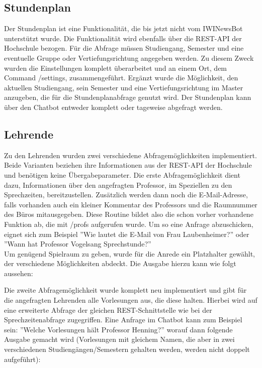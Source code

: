 \subsection{Stundenplan}
Der Stundenplan ist eine Funktionalität, die bis jetzt nicht vom IWINewsBot unterstützt wurde. Die Funktionalität wird ebenfalls über die REST-API der Hochschule bezogen. Für die Abfrage müssen Studiengang, Semester und eine eventuelle Gruppe oder Vertiefungsrichtung angegeben werden. Zu diesem Zweck wurden die Einstellungen komplett überarbeitet und an einem Ort, dem Command /settings, zusammengeführt. Ergänzt wurde die Möglichkeit, den aktuellen Studiengang, sein Semester und eine Vertiefungsrichtung im Master anzugeben, die für die Stundenplanabfrage genutzt wird.
Der Stundenplan kann über den Chatbot entweder komplett oder tageweise abgefragt werden.

\subsection{Lehrende}
Zu den Lehrenden wurden zwei verschiedene Abfragemöglichkeiten implementiert. Beide Varianten beziehen ihre Informationen aus der REST-API der Hochschule und benötigen keine Übergabeparameter. 
Die erste Abfragemöglichkeit dient dazu, Informationen über den angefragten Professor, im Speziellen zu den Sprechzeiten, bereitzustellen. Zusätzlich werden dann noch die E-Mail-Adresse, falls vorhanden auch ein kleiner Kommentar des Professors und die Raumnummer des Büros mitausgegeben. Diese Routine bildet also die schon vorher vorhandene Funktion ab, die mit /profs aufgerufen wurde. Um so eine Anfrage abzuschicken, eignet sich zum Beispiel ''Wie lautet die E-Mail von Frau Laubenheimer?'' oder ''Wann hat Professor Vogelsang Sprechstunde?'' \\
Um genügend Spielraum zu geben, wurde für die Anrede ein Platzhalter gewählt, der verschiedene Möglichkeiten abdeckt. Die Ausgabe hierzu kann wie folgt aussehen:


Die zweite Abfragemöglichkeit wurde komplett neu implementiert und gibt für die angefragten Lehrenden alle Vorlesungen aus, die diese halten. Hierbei wird auf eine erweiterte Abfrage der gleichen REST-Schnittstelle wie bei der Sprechzeitenabfrage zugegriffen. Eine Anfrage im Chatbot kann zum Beispiel sein: ''Welche Vorlesungen hält Professor Henning?'' worauf dann folgende Ausgabe gemacht wird (Vorlesungen mit gleichem Namen, die aber in zwei verschiedenen Studiengängen/Semestern gehalten werden, werden nicht doppelt aufgeführt):

